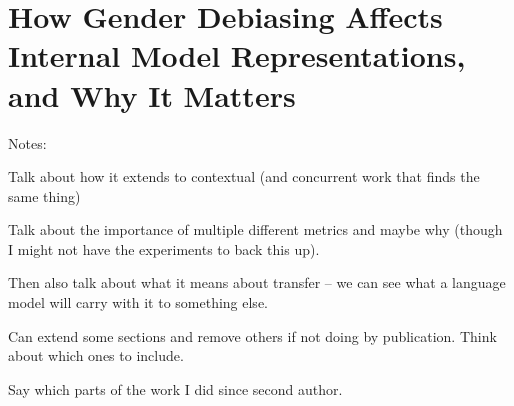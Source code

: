 \chapter{How Gender Debiasing Affects Internal Model Representations,
and Why It Matters}\label{chapter:gender_bias_probing}

Notes:

Talk about how it extends to contextual (and concurrent work that finds the same thing)

Talk about the importance of multiple different metrics and maybe why (though I might not have the experiments to back this up).

Then also talk about what it means about transfer -- we can see what a language model will carry with it to something else. 


Can extend some sections and remove others if not doing by publication. Think about which ones to include.

Say which parts of the work I did since second author. 